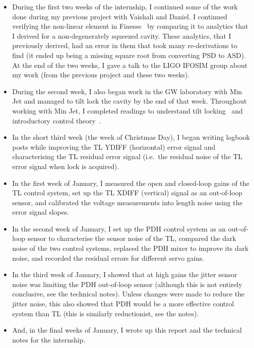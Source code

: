 \documentclass[aps,pra,superscriptaddress,reprint,nofootinbib]{revtex4-1}
\begin{document}
\begin{itemize}
\item During the first two weeks of the internship, I continued some of the work done during my previous project with Vaishali and Daniel. I continued verifying the non-linear element in Finesse~\cite{finesse} by comparing it to analytics that I derived for a non-degenerately squeezed cavity. These analytics, that I previously derived, had an error in them that took many re-derivations to find (it ended up being a missing square root from converting PSD to ASD).
At the end of the two weeks, I gave a talk to the LIGO IFOSIM group about my work (from the previous project and these two weeks).
\item During the second week, I also began work in the GW laboratory with Min Jet and managed to tilt lock the cavity by the end of that week. Throughout working with Min Jet, I completed readings to understand tilt locking~\cite{TL:1999} and introductory control theory~\cite{Ward:2010,Bechhoefer:2005,FCS:2000}.
\item In the short third week (the week of Christmas Day), I began writing logbook posts while improving the TL YDIFF (horizontal) error signal and characterising the TL residual error signal (i.e.\ the residual noise of the TL error signal when lock is acquired).
\item In the first week of January, I measured the open and closed-loop gains of the TL control system, set up the TL XDIFF (vertical) signal as an out-of-loop sensor, and calibrated the voltage measurements into length noise using the error signal slopes.
\item In the second week of January, I set up the PDH control system as an out-of-loop sensor to characterise the sensor noise of the TL, compared the dark noise of the two control systems, replaced the PDH mixer to improve its dark noise, and recorded the residual errors for different servo gains.
\item In the third week of January, I showed that at high gains the jitter sensor noise was limiting the PDH out-of-loop sensor (although this is not entirely conclusive, see the technical notes). Unless changes were made to reduce the jitter noise, this also showed that PDH would be a more effective control system than TL (this is similarly reductionist, see the notes).
\item And, in the final weeks of January, I wrote up this report and the technical notes for the internship.
\end{itemize}


\nocite{*}


\end{document}

